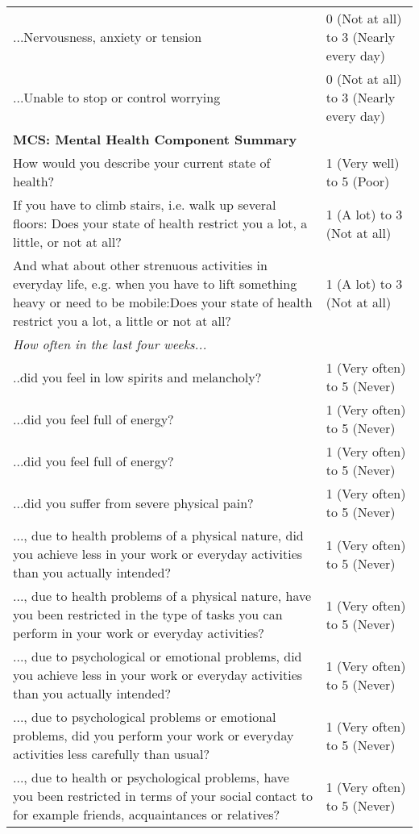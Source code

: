 \begin{center}
\begin{small}
\begin{longtable}{p{8cm}p{4cm}}
...Nervousness, anxiety or tension & 0 (Not at all) to 3 (Nearly every day)\\
...Unable to stop or control worrying & 0 (Not at all) to 3 (Nearly every day)\\ 
\hline
\textbf{MCS: Mental Health Component Summary} &  \vspace{0.2cm}  \\
How would you describe your current state of health? & 1 (Very well) to 5 (Poor) \\
If you have to climb stairs, i.e. walk up several floors: Does your state of health restrict you a lot, a little, or not at all? & 1 (A lot) to 3 (Not at all) \\
And what about other strenuous activities in everyday life, e.g. when you have to lift something heavy or need to be mobile:Does your state of health restrict you a lot, a little or not at all? & 1 (A lot) to 3 (Not at all) \\
\multicolumn{2}{p{13cm}}{\textit{How often in the last four weeks...}} \\
..did you feel in low spirits and melancholy? & 1 (Very often) to 5 (Never) \\
...did you feel full of energy? & 1 (Very often) to 5 (Never) \\
...did you feel full of energy? & 1 (Very often) to 5 (Never) \\
...did you suffer from severe physical pain? & 1 (Very often) to 5 (Never) \\
..., due to health problems of a physical nature, did you achieve less in your work or everyday activities than you actually intended? & 1 (Very often) to 5 (Never) \\
..., due to health problems of a physical nature, have you been restricted in the type of tasks you can perform in your work or everyday activities? & 1 (Very often) to 5 (Never) \\
..., due to psychological or emotional problems, did you achieve less in your work or everyday activities than you actually intended? & 1 (Very often) to 5 (Never) \\
..., due to psychological problems or emotional problems, did you perform your work or everyday activities less carefully than usual? & 1 (Very often) to 5 (Never) \\
..., due to health or psychological problems, have you been restricted in terms of your social contact to for example friends, acquaintances or relatives? & 1 (Very often) to 5 (Never) \\
\end{longtable}
\end{small}
\end{center}
